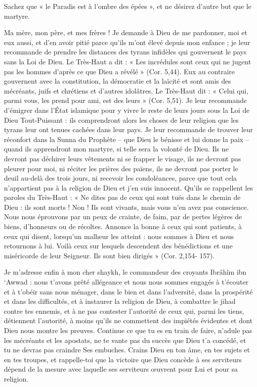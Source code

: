 Sachez que « le Paradis est à l'ombre des épées », et ne désirez d'autre
but que le martyre.

Ma mère, mon père, et mes frères ! Je demande à Dieu de me pardonner,
moi et eux aussi, et d'en avoir pitié parce qu'ils m'ont élevé depuis
mon enfance ; je leur recommande de prendre les distances des tyrans
infidèles qui gouvernent le pays sans la Loi de Dieu. Le Très-Haut a dit
: « Les incrédules sont ceux qui ne jugent pas les hommes d'après ce que
Dieu a révélé » (Cor. 5,44). Eux au contraire gouvernent avec la
constitution, la démocratie et la laïcité et sont amis des mécréants,
juifs et chrétiens et d'autres idolâtres. Le Très-Haut dit : « Celui
qui, parmi vous, les prend pour ami, est des leurs » (Cor. 5,51). Je
leur recommande d'émigrer dans l'État islamique pour y vivre le reste de
leurs jours sous la Loi de Dieu Tout-Puissant : ils comprendront alors
les choses de leur religion que les tyrans leur ont tenues cachées dans
leur pays. Je leur recommande de trouver leur réconfort dans la Sunna du
Prophète -- que Dieu le bénisse et lui donne la paix -- quand ils
apprendront mon martyre, si telle sera la volonté de Dieu. Ils ne
devront pas déchirer leurs vêtements ni se frapper le visage, ils ne
devront pas pleurer pour moi, ni réciter les prières des païens, ils ne
devront pas porter le deuil au-delà des trois jours, ni recevoir les
condoléances, parce que tout cela n'appartient pas à la religion de Dieu
et j'en suis innocent. Qu'ils se rappellent les paroles du Très-Haut : «
Ne dites pas de ceux qui sont tués dans le chemin de Dieu : ils sont
morts ! Non ! Ils sont vivants, mais vous n'en avez pas conscience. Nous
nous éprouvons par un peux de crainte, de faim, par de pertes légères de
biens, d'honneurs ou de récoltes. Annonce la bonne à ceux qui sont
patients, à ceux qui disent, lorsqu'un malheur les atteint : nous sommes
à Dieu et nous retournons à lui. Voilà ceux sur lesquels descendent des
bénédictions et une miséricorde de leur Seigneur. Ils sont bien dirigés
» (Cor. 2,154- 157).

Je m'adresse enfin à mon cher shaykh, le commandeur des croyants Ibrâhîm
ibn `Awwad : nous t'avons prêté allégeance et nous nous sommes engagés à
t'écouter et à t'obéir sans nous ménager, dans le bien et dans
l'adversité, dans la prospérité et dans les difficultés, et à instaurer
la religion de Dieu, à combattre le jihad contre tes ennemis, et à ne
pas contester l'autorité de ceux qui, parmi les tiens, détiennent
l'autorité, à moins qu'ils ne commettent des impiétés évidentes et dont
Dieu nous montre les preuves. Continue ce que tu es en train de faire,
n'adule pas les mécréants et les apostats, ne te vante pas du succès que
Dieu t'a concédé, et tu ne devras pas craindre Ses embuches. Crains Dieu
en ton âme, en tes sujets et en tes troupes, et rappelle-toi que la
victoire que Dieu concède à ses serviteurs dépend de la mesure avec
laquelle ses serviteurs œuvrent pour Lui et pour sa religion.

